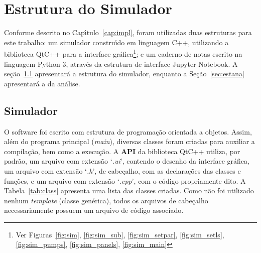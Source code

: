 \chapter{Estrutura do Simulador}
\label{apend:estr}

Conforme descrito no Cap{\'\i}tulo~\ref{cap:impl}, foram utilizadas duas estruturas para este trabalho: um simulador constru{\'\i}do em linguagem C++, utilizando a biblioteca QtC++ para a interface gr{\'a}fica\footnote{Ver Figuras~\ref{fig:sim}, \ref{fig:sim_sub}, \ref{fig:sim_setpar}, \ref{fig:sim_setls}, \ref{fig:sim_pumps}, \ref{fig:sim_panels}, \ref{fig:sim_main}}; e um caderno de notas escrito na linguagem Python 3, atrav{\'e}s da estrutura de interface Jupyter-Notebook. A se{\c c}{\~a}o~\ref{sec:estsim} apresentar{\'a} a estrutura do simulador, enquanto a Se{\c c}{\~a}o~\ref{sec:estana} apresentar{\'a} a da an{\'a}lise.

\section{Simulador} \label{sec:estsim}

O software foi escrito com estrutura de programa{\c c}{\~a}o  orientada a objetos. Assim, al{\'e}m do programa principal (\textit{main}), diversas classes foram criadas para auxiliar a compila{\c c}{\~a}o, bem como a execu{\c c}{\~a}o. A \textbf{API} da biblioteca QtC++ utiliza, por padr{\~a}o, um arquivo com extens{\~a}o `\textit{.ui}', contendo o desenho da interface gr{\'a}fica, um arquivo com extens{\~a}o `\textit{.h}', de cabe{\c c}alho, com as declara{\c c}{\~o}es das classes e fun{\c c}{\~o}es, e um arquivo com extens{\~a}o `\textit{.cpp}', com o c{\'o}digo propriamente dito. A Tabela~\ref{tab:class} apresenta uma lista das classes criadas. Como n{\~a}o foi utilizado nenhum \textit{template} (classe gen{\'e}rica), todos os arquivos de cabe{\c c}alho necessariamente possuem um arquivo de c{\'o}digo associado.

